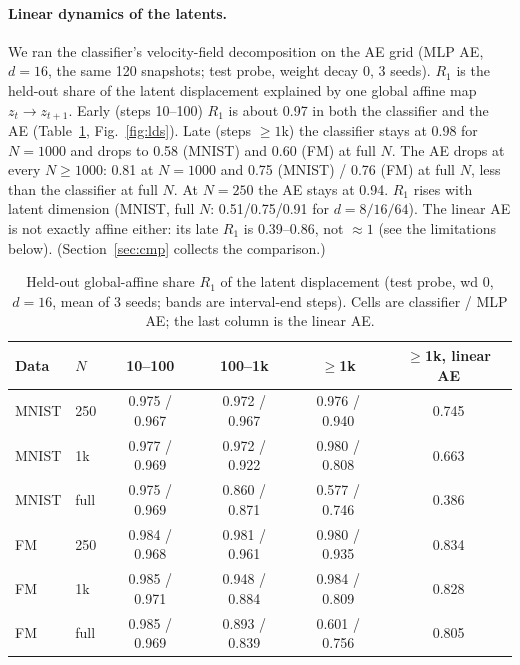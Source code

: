 \documentclass[10pt]{article}
\begin{document}
\paragraph{Linear dynamics of the latents.} We ran the classifier's velocity-field decomposition on the AE grid (MLP AE, $d=16$, the same 120 snapshots; test probe, weight decay 0, 3 seeds). $R_1$ is the held-out share of the latent displacement explained by one global affine map $z_t\to z_{t+1}$. Early (steps 10--100) $R_1$ is about 0.97 in both the classifier and the AE (Table~\ref{tab:lds}, Fig.~\ref{fig:lds}). Late (steps $\ge1$k) the classifier stays at 0.98 for $N=1000$ and drops to 0.58 (MNIST) and 0.60 (FM) at full $N$. The AE drops at every $N\ge1000$: 0.81 at $N=1000$ and 0.75 (MNIST) / 0.76 (FM) at full $N$, less than the classifier at full $N$. At $N=250$ the AE stays at 0.94. $R_1$ rises with latent dimension (MNIST, full $N$: 0.51/0.75/0.91 for $d=8/16/64$). The linear AE is not exactly affine either: its late $R_1$ is 0.39--0.86, not $\approx1$ (see the limitations below). (Section~\ref{sec:cmp} collects the comparison.)

\begin{table}[t]\centering\small
\caption{Held-out global-affine share $R_1$ of the latent displacement (test probe, wd 0, $d=16$, mean of 3 seeds; bands are interval-end steps). Cells are classifier / MLP AE; the last column is the linear AE.}\label{tab:lds}
\begin{tabular}{llcccc}\toprule
Data & $N$ & 10--100 & 100--1k & $\ge$1k & $\ge$1k, linear AE\\\midrule
MNIST & 250 & 0.975 / 0.967 & 0.972 / 0.967 & 0.976 / 0.940 & 0.745\\
MNIST & 1k & 0.977 / 0.969 & 0.972 / 0.922 & 0.980 / 0.808 & 0.663\\
MNIST & full & 0.975 / 0.969 & 0.860 / 0.871 & 0.577 / 0.746 & 0.386\\
FM & 250 & 0.984 / 0.968 & 0.981 / 0.961 & 0.980 / 0.935 & 0.834\\
FM & 1k & 0.985 / 0.971 & 0.948 / 0.884 & 0.984 / 0.809 & 0.828\\
FM & full & 0.985 / 0.969 & 0.893 / 0.839 & 0.601 / 0.756 & 0.805\\\bottomrule
\end{tabular}
\end{table}
\end{document}
